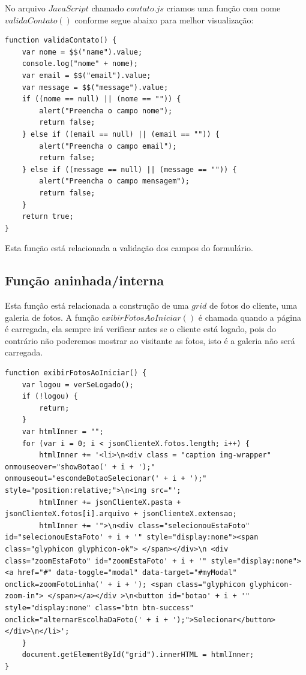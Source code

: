 	No arquivo $JavaScript$ chamado $contato.js$ criamos uma função com nome $validaContato()$ conforme segue abaixo para melhor visualização:
\begin{lstlisting}
function validaContato() {
    var nome = $$("name").value;
    console.log("nome" + nome);
    var email = $$("email").value;
    var message = $$("message").value;
    if ((nome == null) || (nome == "")) {
        alert("Preencha o campo nome");
        return false;
    } else if ((email == null) || (email == "")) {
        alert("Preencha o campo email");
        return false;
    } else if ((message == null) || (message == "")) {
        alert("Preencha o campo mensagem");
        return false;
    }
    return true;
}
\end{lstlisting}
	Esta função está relacionada a validação dos campos do formulário.

\subsection{Função aninhada/interna}

	Esta função está relacionada a construção de uma $grid$ de fotos do cliente, uma galeria de fotos. A função  $exibirFotosAoIniciar()$ é chamada quando a página é carregada, ela sempre irá  verificar antes se o cliente está logado, pois do contrário não poderemos mostrar ao visitante as fotos, isto é a galeria não será carregada. 
	
\begin{lstlisting}
function exibirFotosAoIniciar() {
    var logou = verSeLogado();
    if (!logou) {
        return;
    }
    var htmlInner = "";
    for (var i = 0; i < jsonClienteX.fotos.length; i++) {
        htmlInner += '<li>\n<div class = "caption img-wrapper" onmouseover="showBotao(' + i + ');" onmouseout="escondeBotaoSelecionar(' + i + ');" style="position:relative;">\n<img src="';
        htmlInner += jsonClienteX.pasta + jsonClienteX.fotos[i].arquivo + jsonClienteX.extensao;
        htmlInner += '">\n<div class="selecionouEstaFoto" id="selecionouEstaFoto' + i + '" style="display:none"><span class="glyphicon glyphicon-ok"> </span></div>\n <div class="zoomEstaFoto" id="zoomEstaFoto' + i + '" style="display:none"><a href="#" data-toggle="modal" data-target="#myModal" onclick=zoomFotoLinha(' + i + '); <span class="glyphicon glyphicon-zoom-in"> </span></a></div >\n<button id="botao' + i + '" style="display:none" class="btn btn-success" onclick="alternarEscolhaDaFoto(' + i + ');">Selecionar</button></div>\n</li>';
    }
    document.getElementById("grid").innerHTML = htmlInner;
}
\end{lstlisting}


